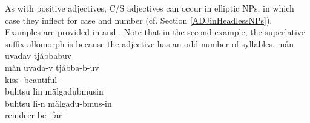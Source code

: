 As with positive adjectives, C/S adjectives can occur in elliptic NPs, in which case they inflect for case and number (cf. Section \ref{ADJinHeadlessNPs}). Examples are provided in  and . Note that in the second example, the superlative suffix allomorph is  because the adjective has an odd number of syllables.
\ea\label{compATTRADJex2}%
\glll	mån uvadav tjábbabuv\\
	mån uvada-v tjábba-b-uv\\
	 kiss- beautiful--\\\nopagebreak
{}	
\z
\ea\label{superlATTRADJex2}
\glll	buhtsu lin mälgadubmusin\\
	buhtsu li-n mälgadu-bmus-in\\
	reindeer\BS{} be- far--\\\nopagebreak
{}	%
\z



